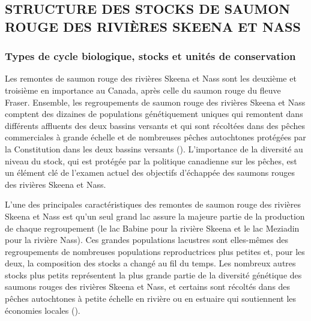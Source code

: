 \documentclass[french,11pt]{book}
\begin{document}
\subsection{STRUCTURE DES STOCKS DE SAUMON ROUGE DES RIVIÈRES SKEENA ET NASS}\label{structure-des-stocks-de-saumon-rouge-des-riviuxe8res-skeena-et-nass}

\subsubsection{Types de cycle biologique, stocks et unités de conservation}\label{types-de-cycle-biologique-stocks-et-unituxe9s-de-conservation}

Les remontes de saumon rouge des rivières Skeena et Nass sont les deuxième et troisième en importance au Canada, après celle du saumon rouge du fleuve Fraser. Ensemble, les regroupements de saumon rouge des rivières Skeena et Nass comptent des dizaines de populations génétiquement uniques qui remontent dans différents affluents des deux bassins versants et qui sont récoltées dans des pêches commerciales à grande échelle et de nombreuses pêches autochtones protégées par la Constitution dans les deux bassins versants (). L'importance de la diversité au niveau du stock, qui est protégée par la politique canadienne sur les pêches, est un élément clé de l'examen actuel des objectifs d'échappée des saumons rouges des rivières Skeena et Nass.

L'une des principales caractéristiques des remontes de saumon rouge des rivières Skeena et Nass est qu'un seul grand lac assure la majeure partie de la production de chaque regroupement (le lac Babine pour la rivière Skeena et le lac Meziadin pour la rivière Nass). Ces grandes populations lacustres sont elles-mêmes des regroupements de nombreuses populations reproductrices plus petites et, pour les deux, la composition des stocks a changé au fil du temps. Les nombreux autres stocks plus petits représentent la plus grande partie de la diversité génétique des saumons rouges des rivières Skeena et Nass, et certains sont récoltés dans des pêches autochtones à petite échelle en rivière ou en estuaire qui soutiennent les économies locales ().
\end{document}
